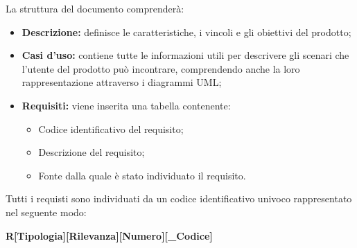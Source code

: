 La struttura del documento comprenderà:
\begin{itemize}
	\item \textbf{Descrizione:} definisce le caratteristiche, i vincoli e gli obiettivi del prodotto;
	\item \textbf{Casi d'uso:} contiene tutte le informazioni utili per descrivere gli scenari che l'utente del prodotto può incontrare, comprendendo anche la loro rappresentazione attraverso i diagrammi UML;
	\item \textbf{Requisiti:} viene inserita una tabella contenente:
	\begin{itemize}
		\item Codice identificativo del requisito;
		\item Descrizione del requisito;
		\item Fonte dalla quale è stato individuato il requisito. 
	\end{itemize} 
\end{itemize}

\label{ClassificazioneRequisiti}Tutti i requisti sono individuati da un codice identificativo univoco rappresentato nel seguente modo:

\begin{center}
	\textbf{R[Tipologia][Rilevanza][Numero][\_Codice]}
\end{center}


